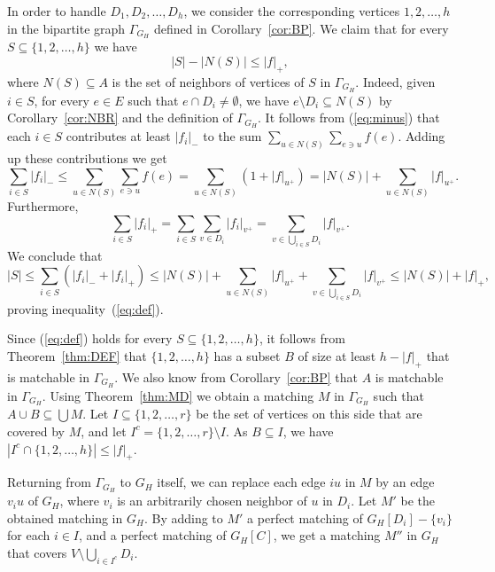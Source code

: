 \documentclass[10pt,a4paper]{amsart}
\begin{document}
In order to handle $D_1, D_2, \ldots , D_h$, we consider the corresponding vertices $1, 2, \ldots , h$ in the bipartite graph $\Gamma_{G_H}$ defined in Corollary~\ref{cor:BP}. We claim that for every $S \subseteq \{1,2, \ldots , h\}$ we have
\begin{equation} \label{eq:def}
|S| - |N(S)| \le |f|_+,
\end{equation}
where $N(S) \subseteq A$ is the set of neighbors of vertices of $S$ in $\Gamma_{G_H}$. Indeed, given $i \in S$, for every $e \in E$ such that $e \cap D_i \ne \emptyset$, we have $e \setminus D_i \subseteq N(S)$ by Corollary~\ref{cor:NBR} and the definition of $\Gamma_{G_H}$. It follows from (\ref{eq:minus}) that each $i \in S$ contributes at least $|f_i|_-$ to the sum $\sum_{u \in N(S)} \sum_{e \ni u} f(e)$. Adding up these contributions we get \[ \sum_{i \in S} |f_i|_- \le \sum_{u \in N(S)} \sum_{e \ni u} f(e) = \sum_{u \in N(S)} (1 + |f|_{u^+}) = |N(S)| + \sum_{u \in N(S)} |f|_{u^+}.\] Furthermore, \[ \sum_{i \in S} |f_i|_+ = \sum_{i \in S} \sum_{v \in D_i} |f_i|_{v^+} = \sum_{v \in \bigcup _{i \in S} D_i} |f|_{v^+}.\] We conclude that \[ |S| \le \sum_{i \in S} (|f_i|_- + |f_i|_+) \le |N(S)| + \sum_{u \in N(S)} |f|_{u^+} +\sum_{v \in \bigcup_{i \in S} D_i} |f|_{v^+} \le |N(S)| + |f|_+,\] proving inequality~(\ref{eq:def}).

Since (\ref{eq:def}) holds for every $S \subseteq \{1,2, \ldots , h\}$, it follows from Theorem~\ref{thm:DEF} that $\{1,2, \ldots , h\}$ has a subset $B$ of size at least $h - |f|_+$ that is matchable in $\Gamma_{G_H}$. We also know from Corollary~\ref{cor:BP} that $A$ is matchable in $\Gamma_{G_H}$. Using Theorem~\ref{thm:MD} we obtain a matching $M$ in $\Gamma_{G_H}$ such that $A \cup B \subseteq \bigcup M$. Let $I \subseteq \{1,2, \ldots , r\}$ be the set of vertices on this side that are covered by $M$, and let $I^c = \{1,2, \ldots , r\} \setminus I$. As $B \subseteq I$, we have $|I^c \cap \{1,2, \ldots , h\}| \le |f|_+$.

Returning from $\Gamma_{G_H}$ to $G_H$ itself, we can replace each edge $iu$ in $M$ by an edge $v_iu$ of $G_H$, where $v_i$ is an arbitrarily chosen neighbor of $u$ in $D_i$. Let $M'$ be the obtained matching in $G_H$. By adding to $M'$ a perfect matching of $G_H[D_i] - \{v_i\}$ for each $i \in I$, and a perfect matching of $G_H[C]$, we get a matching $M''$ in $G_H$ that covers $V \setminus \bigcup_{i \in I^c} D_i$.
\end{document}
